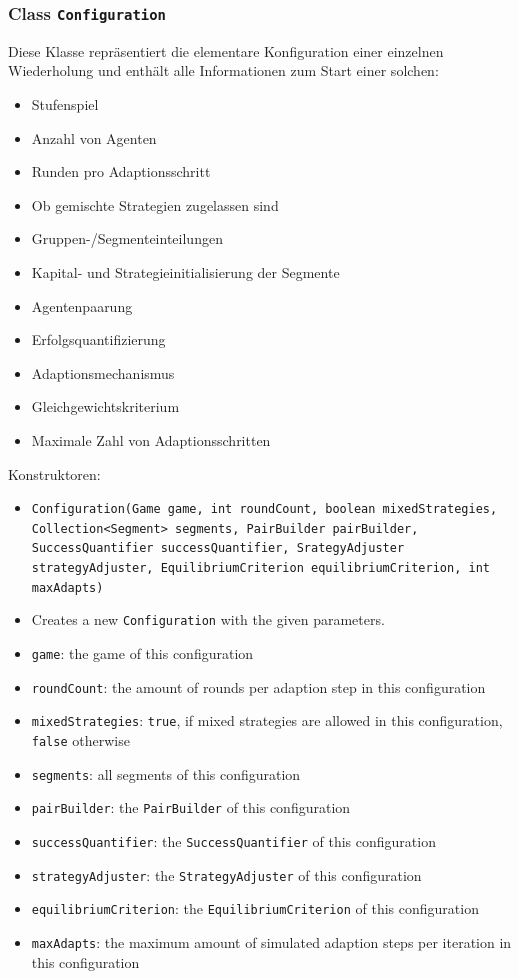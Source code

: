\documentclass[parskip=full,11pt]{scrartcl}
\begin{document}
\subsubsection{Class \texttt{Configuration}}
Diese Klasse repräsentiert die elementare Konfiguration einer einzelnen Wiederholung und enthält alle Informationen zum Start einer solchen:
\begin{itemize}\itemsep -10pt
\item Stufenspiel
\item Anzahl von Agenten
\item Runden pro Adaptionsschritt
\item Ob gemischte Strategien zugelassen sind
\item Gruppen-/Segmenteinteilungen
\item Kapital- und Strategieinitialisierung der Segmente
\item Agentenpaarung
\item Erfolgsquantifizierung
\item Adaptionsmechanismus
\item Gleichgewichtskriterium
\item Maximale Zahl von Adaptionsschritten
\end{itemize}

Konstruktoren:
\begin{itemize}\itemsep -10pt
\item \texttt{Configuration(Game game, int roundCount, boolean mixedStrategies, Collection<Segment> segments, PairBuilder pairBuilder, SuccessQuantifier successQuantifier, SrategyAdjuster strategyAdjuster, EquilibriumCriterion equilibriumCriterion, int maxAdapts)}
\item[] Creates a new \texttt{Configuration} with the given parameters.
\item[] \texttt{game}: the game of this configuration
\item[] \texttt{roundCount}: the amount of rounds per adaption step in this configuration
\item[] \texttt{mixedStrategies}: \texttt{true}, if mixed strategies are allowed in this configuration, \texttt{false} otherwise
\item[] \texttt{segments}: all segments of this configuration
\item[] \texttt{pairBuilder}: the \texttt{PairBuilder} of this configuration
\item[] \texttt{successQuantifier}: the \texttt{SuccessQuantifier} of this configuration
\item[] \texttt{strategyAdjuster}: the \texttt{StrategyAdjuster} of this configuration
\item[] \texttt{equilibriumCriterion}: the \texttt{EquilibriumCriterion} of this configuration
\item[] \texttt{maxAdapts}: the maximum amount of simulated adaption steps per iteration in this configuration
\end{itemize}
\end{document}
